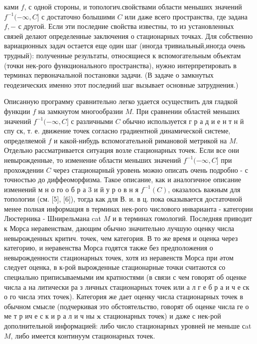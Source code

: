 \documentclass[10pt]{article}
\begin{document}
ками $f$, с одной стороны, и топологич.свойствами области меныших значений $f^{-1}(-\infty, C]$ с достаточно болышими $C$ или даже всего пространства, где задана $f,-$ с другой. Если эти последние свойства известны, то из установленных связей делают определенные заключения о стационарных точках. Для собственно вариационных задач остается еще один шаг (иногда тривиальный,иногда очень трудный): полученные результаты, относящиеся к вспомогательным объектам (точки нек-рого функционального пространства), нужно интерпретировать в терминах первоначальной постановки задачи. (В задаче о замкнутых геодезических именно этот последний шаг вызывает основные затруднения.)



Описанную программу сравнительно легко удается осуществить для гладкой функции $f$ на замкнутом многообразии $M$. При сравнении областей меньших значений $f^{-1}(-\infty, C]$ с различными $C$ обычно используется г р а д и е н т н й спу ск, т. е. движение точек согласно градиентной динамической системе, определяемой $f$ и какой-нибудь вспомогательной римановой метрикой на $M$. Отдельно рассматривается ситуация возле стационарных точек. Если все они невырожденные, то изменение области меньших значений $f^{-1}(-\infty, C]$ при прохождении $C$ через стационарный уровень можно описать очень подробно - с точностью до диффеоморфизма. Такое описание, как и аналогичное описание изменений м н о го о б р а 3 и й у р о в н я $f^{-1}(C)$, оказалось важным для топологии (см. [5], [6]), тогда как для В. и. в ц. пока оказывается достаточной менее полная информация в терминах нек-рого числового инварианта - категории Люстерника - Шнирельмана cat $M$ и в терминах гомологий. Последняя приводит к Морса неравенствам, дающим обычно значительно лучшую оценку числа невырожденных критич. точек, чем категория. В то же время и оценка через категорию, и неравенства Морса годятся также без предположения о невырожденности стационарных точек, хотя из неравенств Морса при әтом следует оценка, в к-рой вырожденные стационарные точки считаются со специально приписываемыми им кратностями (в связи с чем говорят об оценке числа а на литически ра з личных стационарных точек или а л г е б р а и ч е ск о го числа этих точек). Категория же дает оценку числа стационарных точек в обычном смысле (подчеркивая это обстоятельство, говорят об оценке числа ге о ме т р ич е с к и р а л и ч ны $\mathbf{x}$ стационарных точек) и даже с нек-рой дополнительной информацией: либо число стационарных уровней не меньше сat $M$, либо имеется континуум стационарных точек.
\end{document}
